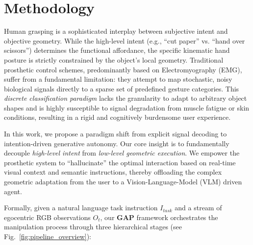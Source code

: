 \documentclass[letterpaper, 10 pt, conference]{ieeeconf}  %
\begin{document}
\section{Methodology}
\label{sec:method}

Human grasping is a sophisticated interplay between subjective intent and objective geometry. While the high-level intent (e.g., ``cut paper'' vs. ``hand over scissors'') determines the functional affordance, the specific kinematic hand posture is strictly constrained by the object's local geometry. 
Traditional prosthetic control schemes, predominantly based on Electromyography (EMG), suffer from a fundamental limitation: they attempt to map stochastic, noisy biological signals directly to a sparse set of predefined gesture categories. This \textit{discrete classification paradigm} lacks the granularity to adapt to arbitrary object shapes and is highly susceptible to signal degradation from muscle fatigue or skin conditions, resulting in a rigid and cognitively burdensome user experience.

In this work, we propose a paradigm shift from explicit signal decoding to intention-driven generative autonomy. Our core insight is to fundamentally decouple \textit{high-level intent} from \textit{low-level geometric execution}. We empower the prosthetic system to ``hallucinate'' the optimal interaction based on real-time visual context and semantic instructions, thereby offloading the complex geometric adaptation from the user to a Vision-Language-Model (VLM) driven agent.

Formally, given a natural language task instruction $I_{task}$ and a stream of egocentric RGB observations $O_t$, our \textbf{GAP} framework orchestrates the manipulation process through three hierarchical stages (see Fig.~\ref{fig:pipeline_overview}):
\end{document}
